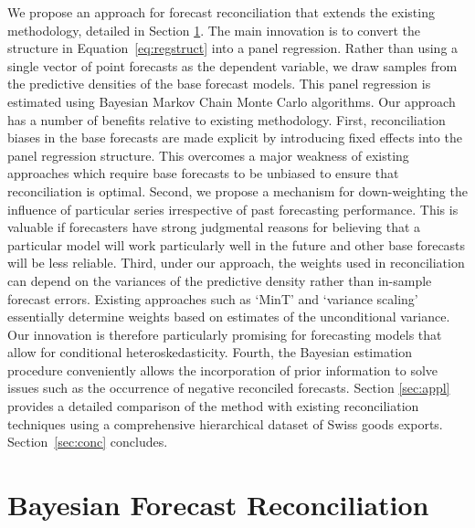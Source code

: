 \documentclass[a4paper,fleqn,11pt]{article}
\begin{document}
We propose an approach for forecast reconciliation that extends the existing methodology, detailed in Section \ref{sec:model}. The main innovation is to convert the structure in Equation~\ref{eq:regstruct} into a panel regression. Rather than using a single vector of point forecasts as the dependent variable, we draw samples from the predictive densities of the base forecast models. This panel regression is estimated using Bayesian Markov Chain Monte Carlo algorithms. Our approach has a number of benefits relative to existing methodology. First, reconciliation biases in the base forecasts are made explicit by introducing fixed effects into the panel regression structure. This overcomes a major weakness of existing approaches which require base forecasts to be unbiased to ensure that reconciliation is optimal. Second, we propose a mechanism for down-weighting the influence of particular series irrespective of past forecasting performance. This is valuable if forecasters have strong judgmental reasons for believing that a particular model will work particularly well in the future and other base forecasts will be less reliable. Third, under our approach, the weights used in reconciliation can depend on the variances of the predictive density rather than in-sample forecast errors.  Existing approaches such as `MinT' and `variance scaling' essentially determine weights based on estimates of the unconditional variance. Our innovation is therefore particularly promising for forecasting models that allow for conditional heteroskedasticity. Fourth, the Bayesian estimation procedure conveniently allows the incorporation of prior information to solve issues such as the occurrence of negative reconciled forecasts. Section \ref{sec:appl} provides a detailed comparison of the method with existing reconciliation techniques using a comprehensive hierarchical dataset of Swiss goods exports. Section~\ref{sec:conc} concludes.

\clearpage

\section{Bayesian Forecast Reconciliation}
\label{sec:model}
\end{document}
